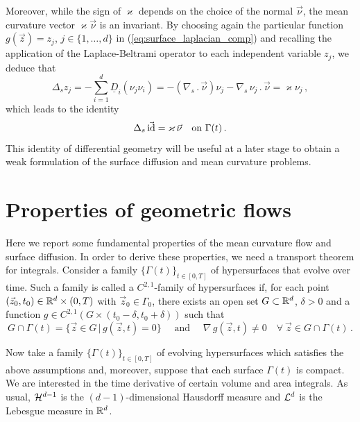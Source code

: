 Moreover, while the sign of $\varkappa$ depends on the choice of the normal
$\vec\nu$, the mean curvature vector $\varkappa \vec\nu$ is an invariant. By
choosing again the particular function $g(\vec z) = z_j$, $j \in \{ 1,
\hdots, d \}$ in (\ref{eq:surface_laplacian_comp}) and recalling the application
of the Laplace-Beltrami operator to each independent variable $z_j$, we deduce
that
\begin{equation}
\Delta_s z_j = - \sum_{i = 1}^{d} \underline{D}_i (\nu_j \nu_i) =
- (\nabla_s \,.\, \vec\nu) \nu_j - \nabla_s \, \nu_j \,.\, \vec\nu = \varkappa
\nu_j\, ,
\end{equation}
which leads to the identity
\begin{equation} \label{eq:LBop}
\Delta_s\, \vec {\rm id} = \varkappa\, \vec\nu \quad \mbox{on $\Gamma(t)$}\,.
\end{equation}
This identity of differential geometry will be useful at a later stage to
obtain a weak formulation of the surface diffusion and mean curvature problems.

\section{Properties of geometric flows}\label{sec:geometric_flows_properties}
Here we report some fundamental properties of the mean curvature flow and
surface diffusion. In order to derive these properties, we need a transport
theorem for integrals. Consider a family $\{ \Gamma(t) \}_{t \in [0, T]}$
of hypersurfaces that evolve over time. Such a family is called a
$C^{2,1}$-family of hypersurfaces if, for each point $(\vec z_0, t_0) \in
{\mathbb R}^{d} \times (0, T)$ with $\vec z_0 \in \Gamma_0$, there exists an
open set $G \subset {\mathbb R}^{d}$, $\delta > 0$ and a function
$g \in C^{2,1}(G \times (t_0 - \delta, t_0 + \delta))$ such that
\begin{equation}
G \cap \Gamma (t) = \{ \vec{z} \in G \, | \, g (\vec z, t) = 0 \}
\quad \mbox{ and } \quad \nabla \, g (\vec z, t) \neq 0
\quad \forall\ \vec z \in G \cap \Gamma(t) \, .
\end{equation}

Now take a family $\{ \Gamma(t) \}_{t \in [0, T]}$ of evolving hypersurfaces
which satisfies the above assumptions and, moreover, suppose that each surface
$\Gamma(t)$ is compact. We are interested in the time derivative of certain
volume and area integrals. As usual, $\mathcal{H}^{d-1}$ is the $(d-1)$-dimensional
Hausdorff measure and $\mathcal{L}^d$ is the Lebesgue measure in ${\mathbb R}^d$.

